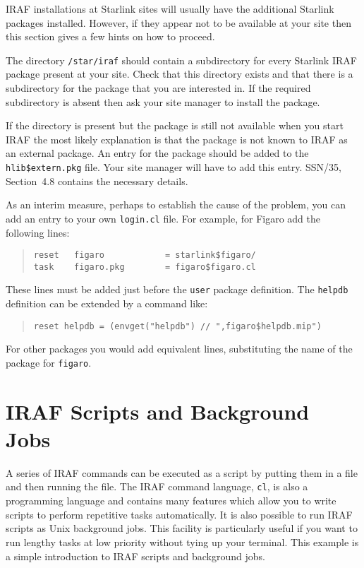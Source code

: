 \documentclass[twoside,11pt]{article}
\newcommand{\xref}[3]{#1}
\newcommand{\xlabel}[1]{}
\begin{document}
IRAF installations at Starlink sites will usually have the additional
Starlink packages installed.  However, if they appear not to be
available at your site then this section gives a few hints on how to
proceed.

The directory {\tt /star/iraf} should contain a subdirectory for every
Starlink IRAF package present at your site.  Check that this directory
exists and that there is a subdirectory for the package that you are
interested in.  If the required subdirectory is absent then ask your
site manager to install the package.

If the directory is present but the package is still not available
when you start IRAF the most likely explanation is that the package
is not known to IRAF as an external package.  An entry for the package
should be added to the {\tt hlib\$extern.pkg} file.  Your site manager
will have to add this entry.  \xref{SSN/35}{ssn35}{}\cite{SSN35},
Section~4.8 contains the necessary details.

As an interim measure, perhaps to establish the cause of the problem,
you can add an entry to your own {\tt login.cl} file.  For example,
for Figaro add the following lines:

\begin{quote} \begin{verbatim}
reset   figaro            = starlink$figaro/
task    figaro.pkg        = figaro$figaro.cl
\end{verbatim} \end{quote}

These lines must be added just before the {\tt user} package definition.
The {\tt helpdb} definition can be extended by a command like:

\begin{quote} \begin{verbatim}
reset helpdb = (envget("helpdb") // ",figaro$helpdb.mip")
\end{verbatim} \end{quote}

For other packages you would add equivalent lines, substituting the
name of the package for {\tt figaro}.


\newpage
\section{\xlabel{SCRIPTS}\label{SCRIPTS}IRAF Scripts and Background Jobs}

A series of IRAF commands can be executed as a script by putting them
in a file and then running the file. The IRAF command language, {\tt cl},
is also a programming language and contains many features which allow
you to write scripts to perform repetitive tasks automatically.  It is
also possible to run IRAF scripts as Unix background jobs.  This
facility is particularly useful if you want to run lengthy tasks
at low priority without tying up your terminal.  This example is a
simple introduction to IRAF scripts and background jobs.
\end{document}
